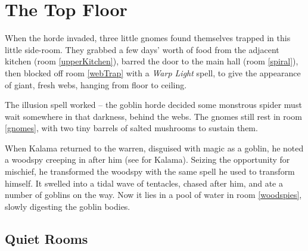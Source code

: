 \chapter{The Top Floor}
\epigraph{
  \iftoggle{hardcore}{
    I have township, yet no houses.
    Forests, but no trees.
    Rivers, but no water.
  }{
    Never resting, never still.

    Moving silently from hill to hill.

    It does not walk, run or trot.

    All is cool where it is not.
  }
}{}

\noindent
When the horde invaded, three little gnomes found themselves trapped in this little side-room.
They grabbed a few days' worth of food from the adjacent kitchen (room \ref{upperKitchen}),
barred the door to the main hall (room \ref{spiral}), then blocked off room \ref{webTrap} with a \textit{Warp Light} spell, to give the appearance of giant, fresh webs, hanging from floor to ceiling.

The illusion spell worked -- the goblin horde decided some monstrous spider must wait somewhere in that darkness, behind the webs.
The gnomes still rest in room \ref{gnomes}, with two tiny barrels of salted mushrooms to sustain them.

When Kalama%
returned to the warren, disguised with magic as a goblin, he noted a woodspy%
creeping in after him
(see  for Kalama).
Seizing the opportunity for mischief, he transformed the woodspy with the same spell he used to transform himself.
It swelled into a tidal wave of tentacles, chased after him, and ate a number of goblins on the way.
Now it lies in a pool of water in room \ref{woodspies}, slowly digesting the goblin bodies.

\section{Quiet Rooms}
\label{upper}

